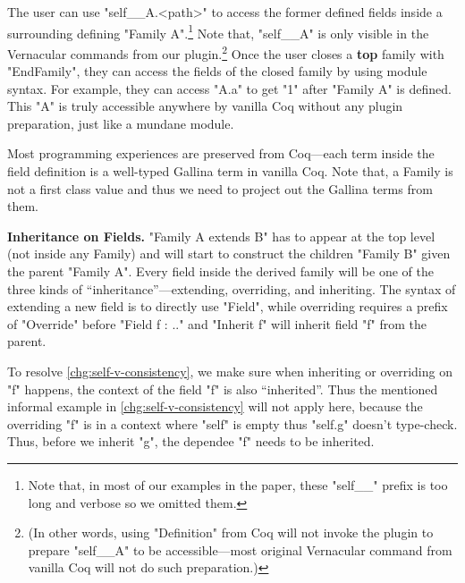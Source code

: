 The user can use "self__A.<path>" to access the former defined fields inside a surrounding defining "Family A".\footnote{Note that, in most of our examples in the paper, these "self__" prefix is too long and verbose so we omitted them.} Note that, "self__A" is only visible in the Vernacular commands from our plugin.\footnote{(In other words, using "Definition" from Coq will not invoke the plugin to prepare "self__A" to be accessible---most original Vernacular command from vanilla Coq will not do such preparation.)}  Once the user closes a \textbf{top} family with "EndFamily", they can access the fields of the closed family by using module syntax. For example, they can access "A.a" to get "1" after "Family A" is defined. This "A" is truly accessible anywhere by vanilla Coq without any plugin preparation, just like a mundane module.

Most programming experiences are preserved from Coq---each term inside the field definition is a well-typed Gallina term in vanilla Coq. Note that, a Family is not a first class value and thus we need to project out the Gallina terms from them.

\textbf{Inheritance on Fields.} "Family A extends B" has to appear at
the top level (not inside any Family) and will start to construct the
children "Family B" given the parent "Family A". Every field inside the
derived family will be one of the three kinds of
``inheritance''---extending, overriding, and inheriting.
The syntax of extending a new field is to directly use "Field", while
overriding requires a prefix of "Override" before "Field f : .." and
"Inherit f" will inherit field "f" from the parent. 

To resolve \ref{chg:self-v-consistency}, we make sure when inheriting or
overriding on "f" happens, the context of the field "f" is also
``inherited''. Thus the mentioned informal example in
\ref{chg:self-v-consistency} will not apply here, because the overriding "f" is
in a context where "self" is empty thus "self.g" doesn't
type-check. Thus, before we inherit "g", the dependee "f" needs to be
inherited.  


